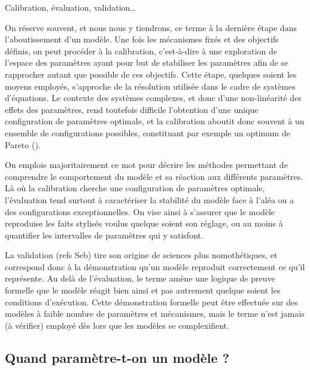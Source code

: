 \documentclass[12pt, a4paper, oneside]{book}
\begin{document}
\begin{encadre}{Calibration, évaluation, validation\ldots\label{enc:termes-calibration}}
	\begin{description}[style=nextline]	
		\item[Calibration] On réserve souvent, et nous nous y tiendrons, ce terme à la dernière étape dans l'aboutissement d'un modèle.
		Une fois les mécanismes fixés et des objectifs définis, on peut procéder à la calibration, c'est-à-dire à une exploration de l'espace des paramètres ayant pour but de stabiliser les paramètres afin de se rapprocher autant que possible de ces objectifs.
		Cette étape, quelques soient les moyens employés, s'approche de la résolution utilisée dans le cadre de systèmes d'équations.
		Le contexte des systèmes complexes, et donc d'une non-linéarité des effets des paramètres, rend toutefois difficile l'obtention d'une unique configuration de paramètres optimale, et la calibration aboutit donc souvent à un ensemble de configurations possibles, constituant par exemple un optimum de Pareto ().
		
		\item[Évaluation] On emploie majoritairement ce mot pour décrire les méthodes permettant de comprendre le comportement du modèle et sa réaction aux différents paramètres.
		Là où la calibration cherche une configuration de paramètres optimale, l'évaluation tend surtout à caractériser la stabilité du modèle face à l'aléa ou a des configurations exceptionnelles.
		On vise ainsi à s'assurer que le modèle reproduise les faits stylisés voulus quelque soient son réglage, ou au moins à quantifier les intervalles de paramètres qui y satisfont.
		
		\item[Validation] La validation (refs Seb) tire son origine de sciences plus nomothétiques, et correspond donc à la démonstration qu'un modèle reproduit correctement ce qu'il représente. Au delà de l'évaluation, le terme amène une logique de preuve formelle que le modèle réagit bien ainsi et pas autrement quelque soient les conditions d'exécution. Cette démonstration formelle peut être effectuée sur des modèles à faible nombre de paramètres et mécanismes, mais le terme n'est jamais (à vérifier) employé dès lors que les modèles se complexifient.
	\end{description}
\end{encadre}


\subsection{Quand paramètre-t-on un modèle ?}
\end{document}
